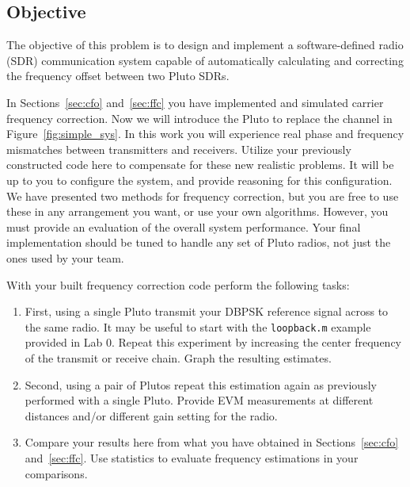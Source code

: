 \documentclass[letterpaper,12pt]{article}
\begin{document}
\subsection{Objective}
The objective of this problem is to design and implement a
software-defined radio (SDR) communication system capable of
automatically calculating and correcting the frequency offset between two Pluto
SDRs.

In Sections~\ref{sec:cfo} and~\ref{sec:ffc} you have implemented and simulated carrier frequency correction.  
Now we will introduce the Pluto to replace the channel in Figure~\ref{fig:simple_sys}. In this work you will 
experience real phase and frequency mismatches between transmitters and receivers.  Utilize your previously 
constructed code here to compensate for these new realistic problems.  It will be up to you to configure the 
system, and provide reasoning for this configuration.  We have presented two methods for frequency correction, 
but you are free to use these in any arrangement you want, or use your own algorithms.  However, you must 
provide an evaluation of the overall system performance.  Your final implementation should be tuned to handle 
any set of Pluto radios, not just the ones used by your team.\par
%
With your built frequency correction code perform the following tasks:
%
\begin{enumerate}
 \item First, using a single Pluto transmit your DBPSK reference signal across to the same radio.  It may be 
useful to start with the \texttt{loopback.m} example provided in Lab 0.  Repeat this experiment by increasing 
the center frequency of the transmit or receive chain.  Graph the resulting estimates.
  \item Second, using a pair of Plutos repeat this estimation again as previously performed with a single 
Pluto.  Provide EVM measurements at different distances and/or different gain setting for the radio.
  \item Compare your results here from what you have obtained in Sections~\ref{sec:cfo} and~\ref{sec:ffc}. 
Use statistics to evaluate frequency estimations in your comparisons.
\end{enumerate}
%
\end{document}
